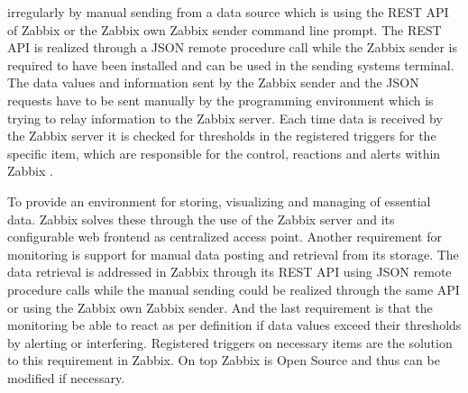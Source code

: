 irregularly by manual sending from a data source which is using the REST API of Zabbix or the Zabbix own Zabbix sender command line prompt. The REST API is realized through a JSON remote procedure call while the Zabbix sender is required to have been installed and can be used in the sending systems terminal. The data values and information sent by the Zabbix sender and the JSON requests have to be sent manually by the programming environment which is trying to relay information to the Zabbix server. Each time data is received by the Zabbix server it is checked for thresholds in the registered triggers for the specific item, which are responsible for the control, reactions and alerts within Zabbix \cite{zab2,zab3}.
	
	To provide an environment for storing, visualizing and managing of essential data. Zabbix solves these through the use of the Zabbix server and its configurable web frontend as centralized access point. Another requirement for monitoring is support for manual data posting and retrieval from its storage. The data retrieval is addressed in Zabbix through its REST API using JSON remote procedure calls while the manual sending could be realized through the same API or using the Zabbix own Zabbix sender. And the last requirement is that the monitoring be able to react as per definition if data values exceed their thresholds by alerting or interfering. Registered triggers on necessary items are the solution to this requirement in Zabbix. On top Zabbix is Open Source and thus can be modified if necessary.
